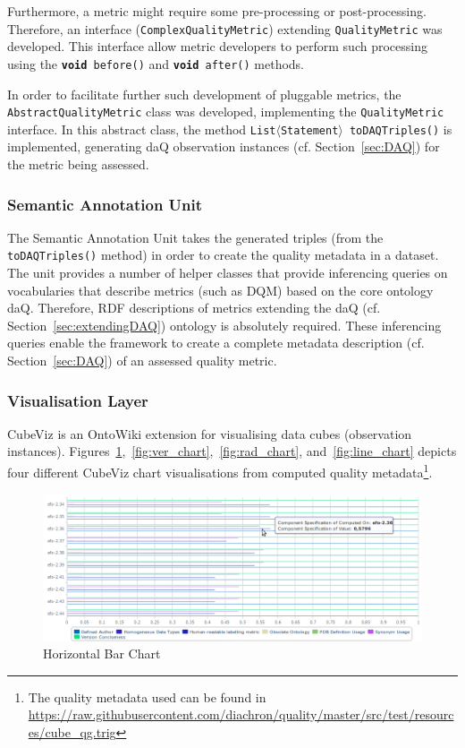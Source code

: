 Furthermore, a metric might require some pre-processing or post-processing.
Therefore, an interface (\texttt{ComplexQualityMetric}) extending \texttt{QualityMetric} was developed.
This interface allow metric developers to perform such processing using the \texttt{\textbf{void} before()} and \texttt{\textbf{void} after()} methods.

In order to facilitate further such development of pluggable metrics, the \texttt{AbstractQualityMetric} class was developed, implementing the \texttt{QualityMetric} interface.
In this abstract class, the method \texttt{List$\langle$Statement$\rangle$ toDAQTriples()} is implemented, generating daQ observation instances (cf. Section~\ref{sec:DAQ}) for the metric being assessed. 

\subsubsection{Semantic Annotation Unit}
The Semantic Annotation Unit takes the generated triples (from the \texttt{toDAQTriples()} method) in order to create the quality metadata in a dataset.
The unit provides a number of helper classes that provide inferencing queries on vocabularies that describe metrics (such as DQM) based on the core ontology daQ.
Therefore, RDF descriptions of metrics extending the daQ (cf. Section~\ref{sec:extendingDAQ}) ontology is absolutely required.
These inferencing queries enable the framework to create a complete metadata description (cf. Section~\ref{sec:DAQ}) of an assessed quality metric.

\subsubsection{Visualisation Layer}
CubeViz is an OntoWiki extension for visualising data cubes (observation instances).
Figures~\ref{fig:hor_chart},~\ref{fig:ver_chart},~\ref{fig:rad_chart}, and~\ref{fig:line_chart} depicts four different CubeViz chart visualisations from computed quality metadata\footnote{The quality metadata used can be found in \url{https://raw.githubusercontent.com/diachron/quality/master/src/test/resources/cube_qg.trig}}.

\begin{figure}[tbph]
\center
  \includegraphics[scale=0.3]{images/cube_1.png}
\caption{Horizontal Bar Chart} 
  \label{fig:hor_chart}
\end{figure}


